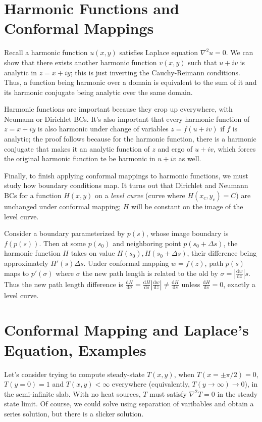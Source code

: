 \documentclass[12pt]{report}
\newcommand{\rd}[2]{\frac{\mathrm{d}#1}{\mathrm{d}#2}}
\newcommand{\abs}[1]{\left|#1\right|}
\begin{document}
\section{Harmonic Functions and Conformal Mappings}

Recall a harmonic function $u(x, y)$ satisfies Laplace equation $\nabla^2 u =
0$. We can show that there exists another harmonic function $v(x, y)$ such that
$u + iv$ is analytic in $z = x + iy$; this is just inverting the Cauchy-Reimann
conditions. Thus, a function being harmonic over a domain is equivalent to the
sum of it and its harmonic conjugate being analytic over the same domain.

Harmonic functions are important because they crop up everywhere, with Neumann
or Dirichlet BCs. It's also important that every harmonic function of $z = x +
iy$ is also harmonic under change of variables $z = f(u + iv)$ if $f$ is
analytic; the proof follows because for the harmonic function, there is a
harmonic conjugate that makes it an analytic function of $z$ and ergo of $u +
iv$, which forces the original harmonic function te be harmonic in $u + iv$ as
well.

Finally, to finish applying conformal mappings to harmonic functions, we must
study how boundary conditions map. It turns out that Dirichlet and Neumann BCs
for a function $H(x, y)$ on a \emph{level curve} (curve where $H(x_c, y_c) = C$)
are unchanged under conformal mapping; $H$ will be constant on the image of the
level curve.

Consider a boundary parameterized by $p(s)$, whose image boundary is $f(p(s))$.
Then at some $p(s_0)$ and neighboring point $p(s_0 + \Delta s)$, the harmonic
function $H$ takes on value $H(s_0), H(s_0 + \Delta s)$, their difference
being approximately $H'(s) \Delta s$. Under conformal mapping $w = f(z)$,
path $p(s)$ maps to $p'(\sigma)$ where $\sigma$ the new path length is related
to the old by $\sigma = \abs{\rd{w}{z}}s$. Thus the new path length difference
is $\rd{H}{\sigma} = \rd{H}{s}\abs{\rd{w}{z}} \neq \rd{H}{s}$ unless $\rd{H}{s}
= 0$, exactly a level curve.

\section{Conformal Mapping and Laplace's Equation, Examples}

Let's consider trying to compute steady-state $T(x, y)$, when $T(x = \pm \pi/2)
= 0$, $T(y = 0) = 1$ and $T(x, y) < \infty$ everywhere (equivalently, $T(y \to
\infty) \to 0$), in the semi-infinite slab. With no heat sources, $T$ must
satisfy $\nabla^2 T = 0$ in the steady state limit. Of course, we could solve
using separation of varibables and obtain a series solution, but there is a
slicker solution.
\end{document}
